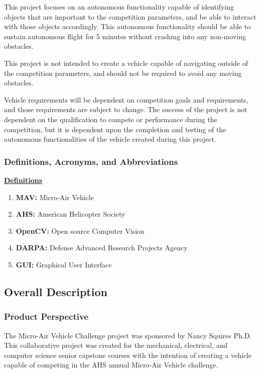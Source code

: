 \documentclass[onecolumn, draftclsnofoot,10pt, compsoc]{IEEEtran}
\begin{document}
This project focuses on an autonomous functionality capable of identifying objects that are important to the competition parameters, and be able to interact with those objects accordingly. This autonomous functionality should be able to sustain autonomous flight for 5 minutes without crashing into any non-moving obstacles.


This project is not intended to create a vehicle capable of navigating outside of the competition parameters, and should not be required to avoid any moving obstacles.


Vehicle requirements will be dependent on competition goals and requirements, and those requirements are subject to change. The success of the project is not dependent on the qualification to compete or performance during the competition, but it is dependent upon the completion and testing of the autonomous functionalities of the vehicle created during this project.


\subsubsection{Definitions, Acronyms, and Abbreviations}

\underline{\textbf{Definitions}}
\begin{enumerate}
\item \textbf{MAV: } Micro-Air Vehicle
\item \textbf{AHS: } American Helicopter Society
\item \textbf{OpenCV: } Open source Computer Vision
\item \textbf{DARPA: } Defense Advanced Research Projects Agency
\item \textbf{GUI: } Graphical User Interface

\end{enumerate}


\subsection{Overall Description}

\subsubsection{Product Perspective}
\indent The Micro-Air Vehicle Challenge project was sponsored by Nancy Squires Ph.D. This collaborative project was created for the mechanical, electrical, and computer science senior capstone courses with the intention of creating a vehicle capable of competing in the AHS annual Micro-Air Vehicle challenge. 
\end{document}
